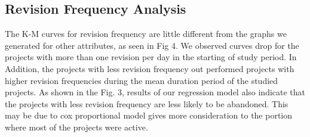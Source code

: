 \documentclass[acmconf]{acmart}
\begin{document}
\subsection{Revision Frequency Analysis} \label{rev-freq-results}

The K-M curves for revision frequency are little different from the graphs we generated for other attributes, as seen in Fig 4. 
We observed curves drop for the projects with more than one revision per day in the starting of study period.
In Addition, the projects with less revision frequency out performed projects with higher revision frequencies during the mean duration period of the studied projects. 
As shown in the Fig. 3, results of our regression model also indicate that the projects with less revision frequency are less likely to be abandoned. 
This may be due to cox proportional model gives more consideration to the portion where most of the projects were active.
\end{document}
